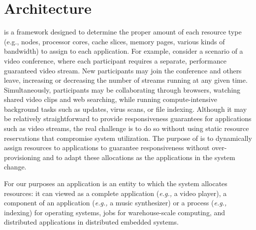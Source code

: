 \section{\pacora Architecture}




\pacora is a framework designed to determine the proper amount of each resource type (e.g., nodes, processor cores, cache slices, memory pages, various kinds of bandwidth) to assign to each application.  For example, consider a scenario of a video conference, where each participant requires a separate,
performance guaranteed video stream. New participants may join the conference and others leave,
increasing or decreasing the number of streams running at any given time.
Simultaneously, participants may be collaborating through browsers, watching
shared video clips and web searching, while running compute-intensive
background tasks such as updates, virus scans, or file indexing. Although it may be relatively straightforward to provide responsiveness guarantees for applications such as video streams, the real challenge is to do so without using static resource reservations that compromise system utilization.  The purpose of \pacora is to dynamically assign resources to applications to guarantee responsiveness without over-provisioning and to adapt these allocations as the applications in the system change.

For our purposes an application is an entity to which the system allocates resources: it can viewed as a complete application (\emph{e.g.,} a video player), a component of an application (\emph{e.g.,} a music synthesizer) or a process (\emph{e.g.,} indexing) for operating systems, jobs for warehouse-scale computing, and distributed applications in distributed embedded systems.

